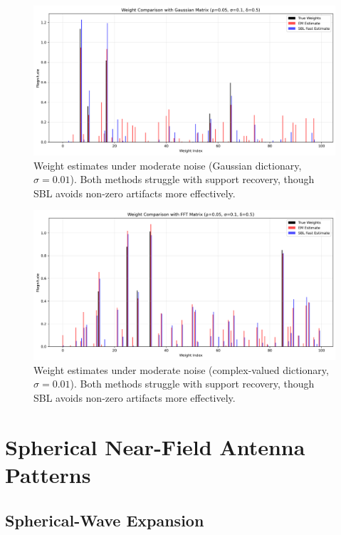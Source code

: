 \documentclass{article}
\begin{document}
\begin{figure}[H]
    \centering
    \includegraphics[width=0.75\linewidth]{Figures/weight_comparison_Gaussian_simga0.1.png}
    \caption{Weight estimates under moderate noise (Gaussian dictionary, $\sigma=0.01$). Both methods struggle with support recovery, though SBL avoids non-zero artifacts more effectively.}
    \label{fig:weight001Gauss}
\end{figure}
\begin{figure}[H]
    \centering
    \includegraphics[width=0.75\linewidth]{Figures/weight_comparison_FFT_simga0.1.png}
    \caption{Weight estimates under moderate noise (complex-valued dictionary, $\sigma=0.01$). Both methods struggle with support recovery, though SBL avoids non-zero artifacts more effectively.}
    \label{fig:weight001FFT}
\end{figure}

\section{Spherical Near-Field Antenna Patterns}
\subsection{Spherical-Wave Expansion}
\end{document}
